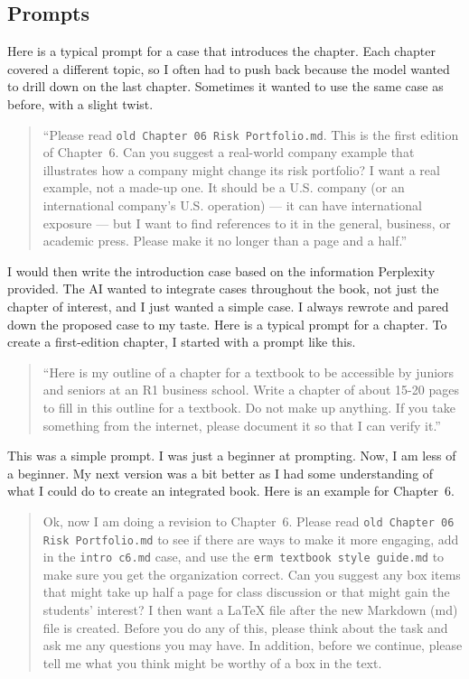 \documentclass[11pt,letterpaper]{article}
\begin{document}
\subsection{Prompts}
\vspace{.75\baselineskip}
Here is a typical prompt for a case that introduces the chapter. Each chapter covered a different topic, so I often had to push back because the model wanted to drill down on the last chapter. Sometimes it wanted to use the same case as before, with a slight twist. 
\vspace{.75\baselineskip}
\begin{quote}\small 
``Please read \texttt{old Chapter 06 Risk Portfolio.md}. This is the first edition of Chapter~6. Can you suggest a real-world company example that illustrates how a company might change its risk portfolio? I want a real example, not a made-up one. It should be a U.S. company (or an international company's U.S. operation) — it can have international exposure — but I want to find references to it in the general, business, or academic press. Please make it no longer than a page and a half.''
\end{quote}
\vspace{.75\baselineskip}
I would then write the introduction case based on the information Perplexity provided. The AI wanted to integrate cases throughout the book, not just the chapter of interest, and I just wanted a simple case. I always rewrote and pared down the proposed case to my taste.
\vspace{.75\baselineskip}
Here is a typical prompt for a chapter. To create a first-edition chapter, I started with a prompt like this. 
\begin{quote}\small
``Here is my outline of a chapter for a textbook to be accessible by juniors and seniors at an R1 business school. Write a chapter of about 15-20 pages to fill in this outline for a textbook. Do not make up anything. If you take something from the internet, please document it so that I can verify it.'' 
\end{quote}

This was a simple prompt. I was just a beginner at prompting. Now, I am less of a beginner. My next version was a bit better as I had some understanding of what I could do to create an integrated book. Here is an example for Chapter~6.

\begin{quote}\small
Ok, now I am doing a revision to Chapter~6. Please read \texttt{old Chapter 06 Risk Portfolio.md} to see if there are ways to make it more engaging, add in the \texttt{intro c6.md} case, and use the \texttt{erm textbook style guide.md} to make sure you get the organization correct. Can you suggest any box items that might take up half a page for class discussion or that might gain the students' interest? I then want a LaTeX file after the new Markdown (md) file is created. Before you do any of this, please think about the task and ask me any questions you may have. In addition, before we continue, please tell me what you think might be worthy of a box in the text.
\end{quote}
\end{document}
